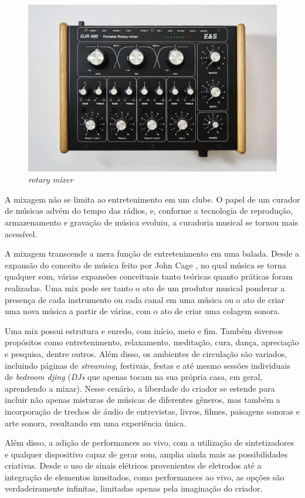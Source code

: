 \begin{figure}[h]
	\centering
    \includegraphics[scale=0.2]{figuras/fig18.png}
	\caption{\textit{rotary mixer}}
	\label{fig18}
\end{figure}

\par
A mixagem não se limita ao entretenimento em um clube. O papel de um curador de músicas advém do tempo das rádios, e, conforme a tecnologia de reprodução, armazenamento e gravação de música evoluiu, a curadoria musical se tornou mais acessível. 

A mixagem transcende a mera função de entretenimento em uma balada. Desde a expansão do conceito de música feito por John Cage \cite{cage}, no qual música se torna qualquer som, várias expansões conceituais tanto teóricas quanto práticas foram realizadas. Uma mix pode ser tanto o ato de um produtor musical ponderar a presença de cada instrumento ou cada canal em uma música ou o ato de criar uma nova música a partir de várias, com o ato de criar uma colagem sonora. 
\par
Uma mix possui estrutura e enredo, com início, meio e fim. Também diversos propósitos como entretenimento, relaxamento, meditação, cura, dança, apreciação e pesquisa, dentre outros. Além disso, os ambientes de circulação são variados, incluindo páginas de \textit{streaming}, festivais, festas e até mesmo sessões individuais de \textit{bedroom djing} (\textit{DJs} que apenas tocam na sua própria casa, em geral, aprendendo a mixar). Nesse cenário, a liberdade do criador se estende para incluir não apenas misturas de músicas de diferentes gêneros, mas também a incorporação de trechos de áudio de entrevistas, livros, filmes, paisagens sonoras e arte sonora, resultando em uma experiência única.
\par
Além disso, a adição de performances ao vivo, com a utilização de sintetizadores e qualquer dispositivo capaz de gerar som, amplia ainda mais as possibilidades criativas. Desde o uso de sinais elétricos provenientes de eletrodos até a integração de elementos inusitados, como performances ao vivo, as opções são verdadeiramente infinitas, limitadas apenas pela imaginação do criador.

